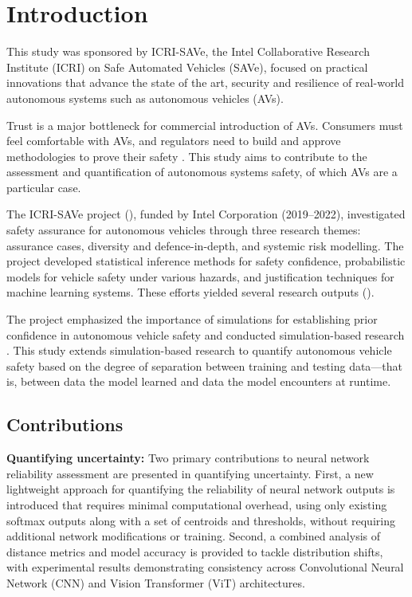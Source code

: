 \chapter{Introduction}
\label{chap:introduction}

This study was sponsored by ICRI-SAVe, the Intel Collaborative Research Institute (ICRI) on Safe Automated Vehicles (SAVe), focused on practical innovations that advance the state of the art, security and resilience of real-world autonomous systems such as autonomous vehicles (AVs).

Trust is a major bottleneck for commercial introduction of AVs. Consumers must feel comfortable with AVs, and regulators need to build and approve methodologies to prove their safety \cite{ICRI-SAVe2024}. This study aims to contribute to the assessment and quantification of autonomous systems safety, of which AVs are a particular case.

The ICRI-SAVe project (\cite{ICRI-SAVe2024}), funded by Intel Corporation (2019–2022), investigated safety assurance for autonomous vehicles through three research themes: assurance cases, diversity and defence-in-depth, and systemic risk modelling. The project developed statistical inference methods for safety confidence, probabilistic models for vehicle safety under various hazards, and justification techniques for machine learning systems. These efforts yielded several research outputs (\cite{bishop2022bootstrapping,aghazadeh2022arguing,buerkle2022modelling,terrosi2022impact,salako2021conservative,zhao2020assessing,bloomfield2021assurance}).

The project emphasized the importance of simulations for establishing prior confidence in autonomous vehicle safety and conducted simulation-based research \cite{zhao2020assessing,terrosi2022impact}. This study extends simulation-based research to quantify autonomous vehicle safety based on the degree of separation between training and testing data—that is, between data the model learned and data the model encounters at runtime.

\section{Contributions}

\textbf{Quantifying uncertainty:} Two primary contributions to neural network reliability assessment are presented in quantifying uncertainty. First, a new lightweight approach for quantifying the reliability of neural network outputs is introduced that requires minimal computational overhead, using only existing softmax outputs along with a set of centroids and thresholds, without requiring additional network modifications or training. Second, a combined analysis of distance metrics and model accuracy is provided to tackle distribution shifts, with experimental results demonstrating consistency across Convolutional Neural Network (CNN) and Vision Transformer (ViT) architectures.

